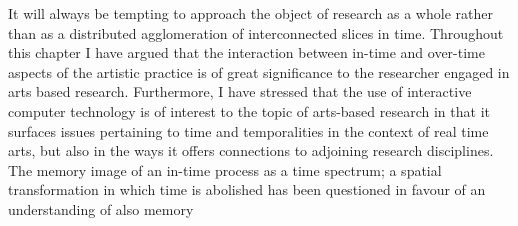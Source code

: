 It will always be tempting to approach the object of research as a whole rather than as a distributed agglomeration of interconnected slices in time. Throughout this chapter I have argued that the interaction between in-time and over-time aspects of the artistic practice is of great significance to the researcher engaged in arts based research. Furthermore, I have stressed that the use of interactive computer technology is of interest to the topic of arts-based research in that it surfaces issues pertaining to time and temporalities in the context of real time arts, but also in the ways it offers connections to adjoining research disciplines. The memory image of an in-time process as a time spectrum; a spatial transformation in which time is abolished has been questioned in favour of an understanding of also memory 









